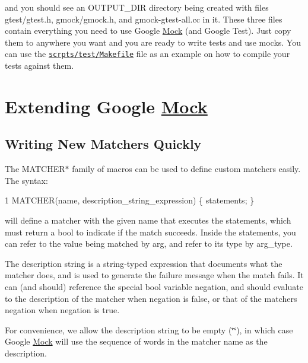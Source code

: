 and you should see an {\ttfamily O\+U\+T\+P\+U\+T\+\_\+\+D\+IR} directory being created with files {\ttfamily gtest/gtest.\+h}, {\ttfamily gmock/gmock.\+h}, and {\ttfamily gmock-\/gtest-\/all.\+cc} in it. These three files contain everything you need to use Google \hyperlink{class_mock}{Mock} (and Google Test). Just copy them to anywhere you want and you are ready to write tests and use mocks. You can use the \href{../scripts/test/Makefile}{\tt scrpts/test/\+Makefile} file as an example on how to compile your tests against them.

\section*{Extending Google \hyperlink{class_mock}{Mock}}

\subsection*{Writing New Matchers Quickly}

The {\ttfamily M\+A\+T\+C\+H\+E\+R$\ast$} family of macros can be used to define custom matchers easily. The syntax\+:


\begin{DoxyCode}
1 MATCHER(name, description\_string\_expression) \{ statements; \}
\end{DoxyCode}


will define a matcher with the given name that executes the statements, which must return a {\ttfamily bool} to indicate if the match succeeds. Inside the statements, you can refer to the value being matched by {\ttfamily arg}, and refer to its type by {\ttfamily arg\+\_\+type}.

The description string is a {\ttfamily string}-\/typed expression that documents what the matcher does, and is used to generate the failure message when the match fails. It can (and should) reference the special {\ttfamily bool} variable {\ttfamily negation}, and should evaluate to the description of the matcher when {\ttfamily negation} is {\ttfamily false}, or that of the matcher\textquotesingle{}s negation when {\ttfamily negation} is {\ttfamily true}.

For convenience, we allow the description string to be empty ({\ttfamily \char`\"{}\char`\"{}}), in which case Google \hyperlink{class_mock}{Mock} will use the sequence of words in the matcher name as the description.

